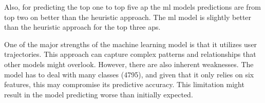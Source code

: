 Also, for predicting the top one to top five \ac{ap} the \ac{ml} models predictions are from top two on better than the heuristic approach.
The \ac{ml} model is slightly better than the heuristic approach for the top three \acp{ap}.

One of the major strengths of the machine learning model is that it utilizes user trajectories.
This approach can capture complex patterns and relationships that other models might overlook.
However, there are also inherent weaknesses.
The model has to deal with many classes (4795), and given that it only relies on six features, this may compromise its predictive accuracy.
This limitation might result in the model predicting worse than initially expected.